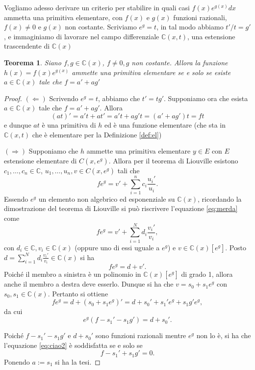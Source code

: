 \documentclass[10pt,oneside]{article}
\theoremstyle{definition}
\theoremstyle{plain}
\newtheorem{teo}{Teorema}
\theoremstyle{definition}
\theoremstyle{plain}
\theoremstyle{plain}
\newcommand{\C}{\mathbb{C}}
\begin{document}
Vogliamo adesso derivare un criterio per stabilire in quali casi $f(x)e^{g(x)}dx$ ammetta una primitiva elementare, con $f(x)$ e $g(x)$ funzioni razionali, $f(x) \neq 0$ e $g(x)$ non costante. Scriviamo $e^g=t$, in tal modo abbiamo $t'/t=g'$, e immaginiamo di lavorare nel campo differenziale $\C(x,t)$, una estensione trascendente di $\C(x)$
\begin{teo}\label{teo:utile}
Siano $f,g \in \C(x)$, $f\neq 0, g$ non costante. Allora la funzione $h(x)=f(x)e^{g(x)}$ ammette una primitiva elementare se e solo se esiste $a \in \C(x)$ tale che $f=a'+ag'$
\end{teo}
\begin{proof}
$(\Leftarrow)$  Scrivendo $e^g=t$, abbiamo che $t'=tg'$. Supponiamo ora che esista $a \in \C(x)$ tale che $f=a'+ag'$. Allora
\[ (at)'=a't+at'=a't+ag't=(a'+ag')t=ft \]
e dunque $at$ è una primitiva di $h$ ed è una funzione elementare (che sta in  $\C(x,t)$ che è elementare per la Definizione \ref{def:el})

$(\Rightarrow) $
Supponiamo che $h$ ammette una primitiva elementare $y \in E$ con $E$ estensione elementare di $C(x,e^g)$. Allora per il teorema di Liouville  esistono $c_1,\dots,c_n \in \C$, $u_1,\dots,u_n,v \in C(x,e^g)$ tali che
\begin{equation}\label{eq:merda}
fe^g=v'+\sum_{i=1}^n c_i\frac{u_i'}{u_i}.
\end{equation}
Essendo $e^g$ un elemento non algebrico ed esponenziale su $\C(x)$, ricordando la dimostrazione del teorema di Liouville si può riscrivere l'equazione \eqref{eq:merda} come 
\[ fe^g=v'+\sum_{i=1}^N d_i\frac{v_i'}{v_i}, \]
con $d_i \in \C, v_i \in \C(x)$ (oppure uno di essi uguale a $e^g$) e $v \in \C(x)[e^g]$. Posto $d=\sum_{i=1}^N d_i\frac{v_i'}{v_i} \in \C(x)$ si ha 
\[ fe^g=d+v'.\] 
Poiché il membro a sinistra è un polinomio in $\C(x)[e^g]$ di grado 1, allora anche il membro a destra deve esserlo. Dunque si ha che $v=s_0+s_1e^g$ con $s_0,s_1 \in \C(x)$. Pertanto si ottiene
\[fe^g=d+(s_0+s_1e^g)'=d+s_0'+s_1'e^g+s_1g'e^g,  \]
da cui 
\begin{equation}\label{eq:ciao2}
e^g(f-s_1'-s_1g')=d+s_0'.
\end{equation}

Poiché $f-s_1'-s_1g'$ e $d+s_0'$ sono funzioni razionali mentre $e^g$ non lo è, si ha che l'equazione \eqref{eq:ciao2} è soddisfatta se e solo se 
\[f-s_1'+s_1g'=0.\]
Ponendo $a:= s_1$ si ha la tesi.

\end{proof}
\end{document}
